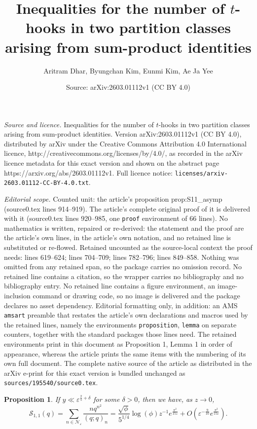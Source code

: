 \documentclass[10pt,a4paper]{amsart}
\title{Inequalities for the number of $t$-hooks in two partition classes arising from sum-product identities}
\author{Aritram Dhar, Byungchan Kim, Eunmi Kim, Ae Ja Yee}
\date{Source: arXiv:2603.01112v1 (CC BY 4.0)}
\newtheorem{proposition}{Proposition}
\begin{document}
\maketitle

\noindent\emph{Source and licence.} Inequalities for the number of $t$-hooks in two partition classes arising from sum-product identities. Version arXiv:2603.01112v1 (CC BY 4.0), distributed by arXiv under the Creative Commons Attribution 4.0 International licence, http://creativecommons.org/licenses/by/4.0/, as recorded in the arXiv licence metadata for this exact version and shown on the abstract page https://arxiv.org/abs/2603.01112v1. Full licence notice: \texttt{licenses/arxiv-2603.01112-CC-BY-4.0.txt}.\par\smallskip

\noindent\textit{Editorial scope.} Counted unit: the article's proposition prop:S11\_asymp (source0.tex lines 914--919). The article's complete original proof of it is delivered with it (source0.tex lines 920--985, one \texttt{proof} environment of 66 lines). No mathematics is written, repaired or re-derived: the statement and the proof are the article's own lines, in the article's own notation, and no retained line is substituted or re-flowed.  Retained uncounted as the source-local context the proof needs: lines 619--624; lines 704--709; lines 782--796; lines 849--858.  Nothing was omitted from any retained span, so the package carries no omission record.  No retained line contains a citation, so the wrapper carries no bibliography and no bibliography entry.  No retained line contains a figure environment, an image-inclusion command or drawing code, so no image is delivered and the package declares no asset dependency.  Editorial formatting only, in addition: an AMS \texttt{amsart} preamble that restates the article's own declarations and macros used by the retained lines, namely the environments \texttt{proposition}, \texttt{lemma} on separate counters, together with the standard packages those lines need.  The retained environments print in this document as Proposition 1, Lemma 1 in order of appearance, whereas the article prints the same items with the numbering of its own full document.  The complete native source of the article as distributed in the arXiv e-print for this exact version is bundled unchanged as \texttt{sources/195540/source0.tex}.
\begin{proposition}\label{prop:S11_narrow}
	If $y \ll \varepsilon^{\frac{2}{5}+\delta}$ for some $\delta>0$, then we have, as $z \to 0$, 
	\[
		\mathcal{S}_{1,1}(q) = \sum_{n \in \mathcal{N}_{\varepsilon}} \frac{nq^{n^2}}{(q;q)_n} = \frac{\sqrt{\phi} }{5^{1/4}}\log(\phi)  z^{-1} e^{\frac{\pi^2}{15 z}} + O\left(\varepsilon^{-\frac{9}{10}} e^{\frac{\pi^2}{15\varepsilon}}\right).
	\]
\end{proposition}
\end{document}
